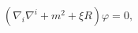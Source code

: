 \begin{equation}
\left( \nabla _{i}\nabla ^{i}+m^{2}+\xi R\right) \varphi =0,\quad
\label{mfieldeq}
\end{equation}

